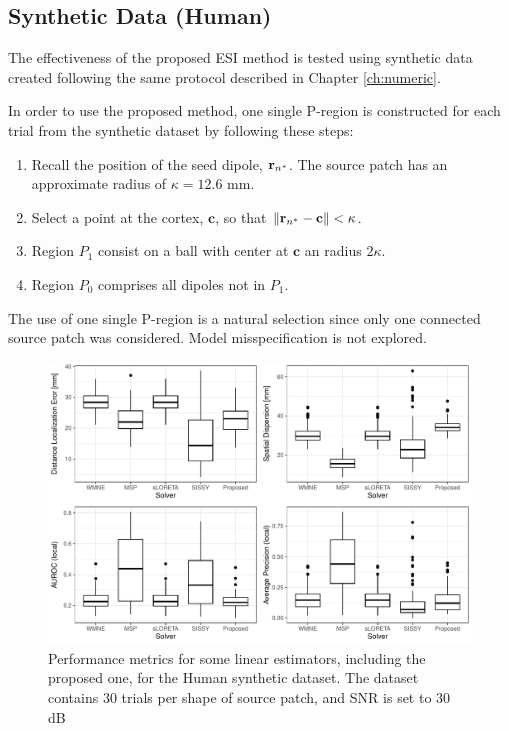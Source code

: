 \subsection{Synthetic Data (Human)}

The effectiveness of the proposed ESI method is tested using synthetic data created following the same protocol described in Chapter \ref{ch:numeric}.

In order to use the proposed method, one single P-region is constructed for each trial from the synthetic dataset by following these steps:
\begin{enumerate}
    \item Recall the position of the seed dipole, $\mathbf{r}_{n^*}$. The source patch has an approximate radius of $\kappa = 12.6$ mm.
    \item Select a point at the cortex, $\mathbf{c}$, so that $\left\lVert \mathbf{r}_{n^*}-\mathbf{c} \right\rVert< \kappa$.
    \item Region $P_1$ consist on a ball with center at $\mathbf{c}$ an radius $2\kappa$.
    \item Region $P_0$ comprises all dipoles not in $P_1$.
\end{enumerate}

The use of one single P-region is a natural selection since only one connected source patch was considered.
%
Model misspecification is not explored.

\begin{figure}
    \centering
    \includegraphics[width=0.9\linewidth]{img_stats/P_plot_EvalMetrics_Protocol04_30ALL.pdf}
    \caption{Performance metrics for some linear estimators, including the proposed one, for the Human synthetic dataset. The dataset contains 30 trials per shape of source patch, and SNR is set to 30 dB}
    \label{fig:results1_P}
\end{figure}

